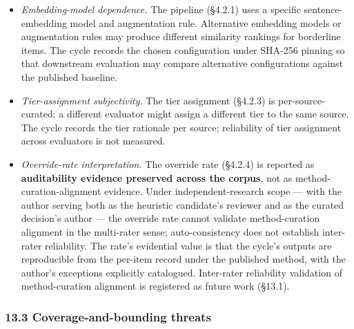 \documentclass[
]{article}
\providecommand{\tightlist}{%
  \setlength{\itemsep}{0pt}\setlength{\parskip}{0pt}}
\begin{document}
\begin{itemize}
\tightlist
\item
  \emph{Embedding-model dependence.} The pipeline (§4.2.1) uses a
  specific sentence-embedding model and augmentation rule. Alternative
  embedding models or augmentation rules may produce different
  similarity rankings for borderline items. The cycle records the chosen
  configuration under SHA-256 pinning so that downstream evaluation may
  compare alternative configurations against the published baseline.
\item
  \emph{Tier-assignment subjectivity.} The tier assignment (§4.2.3) is
  per-source-curated; a different evaluator might assign a different
  tier to the same source. The cycle records the tier rationale per
  source; reliability of tier assignment across evaluators is not
  measured.
\item
  \emph{Override-rate interpretation.} The override rate (§4.2.4) is
  reported as \textbf{auditability evidence preserved across the
  corpus}, not as method-curation-alignment evidence. Under
  independent-research scope --- with the author serving both as the
  heuristic candidate's reviewer and as the curated decision's author
  --- the override rate cannot validate method-curation alignment in the
  multi-rater sense; auto-consistency does not establish inter-rater
  reliability. The rate's evidential value is that the cycle's outputs
  are reproducible from the per-item record under the published method,
  with the author's exceptions explicitly catalogued. Inter-rater
  reliability validation of method-curation alignment is registered as
  future work (§13.1).
\end{itemize}

\subsubsection{13.3 Coverage-and-bounding
threats}\label{coverage-and-bounding-threats}
\end{document}
